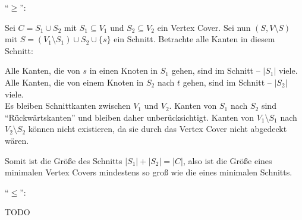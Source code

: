 \documentclass[a4paper]{article}
\begin{document}
"`$\geq$"':

Sei $C = S_1 \cup S_2$ mit $S_1 \subseteq V_1$ und $S_2 \subseteq V_2$ ein Vertex Cover.
Sei nun $( S, V \setminus S)$ mit $S = (V_1 \setminus S_1) \cup S_2 \cup
\{s\}$ ein Schnitt. Betrachte alle Kanten in diesem Schnitt:

Alle Kanten, die von $s$ in einen Knoten in $S_1$ gehen, sind im Schnitt -- $|S_1|$ viele.
\\
Alle Kanten, die von einem Knoten in $S_2$ nach $t$ gehen, sind im Schnitt
-- $|S_2|$ viele. \\
Es bleiben Schnittkanten zwischen $V_1$ und $V_2$. Kanten von $S_1$ nach
$S_2$ sind "`Rückwärtskanten"' und bleiben daher unberücksichtigt. Kanten
von $V_1 \setminus S_1$ nach $V_2 \setminus S_2$ können nicht existieren, da
sie durch das Vertex Cover nicht abgedeckt wären.

Somit ist die Größe des Schnitts $|S_1| + |S_2| = |C|$, also ist die Größe
eines minimalen Vertex Covers mindestens so groß wie die eines minimalen
Schnitts.

"`$\leq$"':

TODO
\end{document}
